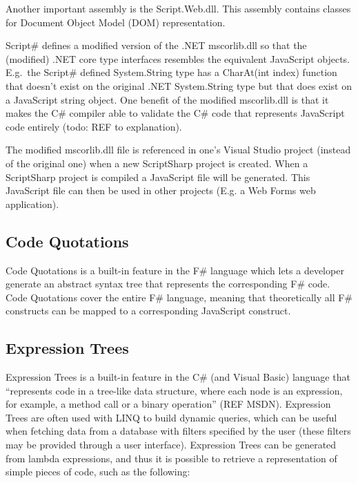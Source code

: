 		Another important assembly is the Script.Web.dll. This assembly contains classes for Document Object Model (DOM) representation.

		Script\# defines a modified version of the .NET mscorlib.dll so that the (modified) .NET core type interfaces resembles the equivalent JavaScript objects. E.g.\ the Script\# defined System.String type has a CharAt(int index) function that doesn't exist on the original .NET System.String type but that does exist on a JavaScript string object. One benefit of the modified mscorlib.dll is that it makes the C\# compiler able to validate the C\# code that represents JavaScript code entirely (todo: REF to explanation). 

		The modified mscorlib.dll file is referenced in one's Visual Studio project (instead of the original one) when a new ScriptSharp project is created. When a ScriptSharp project is compiled a JavaScript file will be generated. This JavaScript file can then be used in other projects (E.g. a Web Forms web application).

	



	\subsection{Code Quotations} %
	\label{ssub:code_quotations}
		Code Quotations is a built-in feature in the F\# language which lets a developer generate an abstract syntax tree that represents the corresponding F\# code. Code Quotations cover the entire F\# language, meaning that theoretically all F\# constructs can be mapped to a corresponding JavaScript construct.


	\subsection{Expression Trees} %
	\label{ssub:expression_trees}
			Expression Trees is a built-in feature in the C\# (and Visual Basic) language that “represents code in a tree-like data structure, where each node is an expression, for example, a method call or a binary operation” (REF MSDN). Expression Trees are often used with LINQ to build dynamic queries, which can be useful when fetching data from a database with filters specified by the user (these filters may be provided through a user interface). Expression Trees can be generated from lambda expressions, and thus it is possible to retrieve a representation of simple pieces of code, such as the following:

